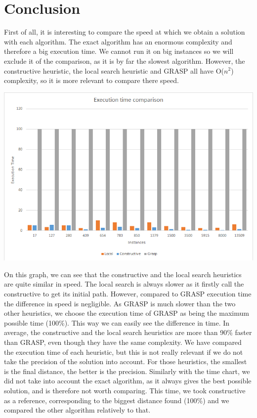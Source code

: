 \documentclass[a4paper, 12pt]{report}
\begin{document}
	\chapter{Conclusion}
	First of all, it is interesting to compare the speed at which we obtain a solution with each algorithm. The exact algorithm has an enormous complexity and therefore a big execution time. We cannot run it on big instances so we will exclude it of the comparison, as it is by far the slowest algorithm.
	However, the constructive heuristic, the local search heuristic and GRASP all have O($n^{2}$) complexity, so it is more relevant to compare there speed.
	\begin{center}
		\includegraphics[width=450pt]{TimeComparison.png}
	\end{center}
	On this graph, we can see that the constructive and the local search heuristics are quite similar in speed. The local search is always slower as it firstly call the constructive to get its initial path. However, compared to GRASP execution time the difference in speed is negligible.
	As GRASP is much slower than the two other heuristics, we choose the execution time of GRASP as being the maximum possible time (100\%). This way we can easily see the difference in time. In average, the constructive and the local search heuristics are more than 90\% faster than GRASP, even though they have the same complexity.
	\BlankLine
	We have compared the execution time of each heuristic, but this is not really relevant if we do not take the precision of the solution into account. For those heuristics, the smallest is the final distance, the better is the precision. Similarly with the time chart, we did not take into account the exact algorithm, as it always gives the best possible solution, and is therefore not worth comparing. This time, we took constructive as a reference, corresponding to the biggest distance found (100\%) and we compared the other algorithm relatively to that.
\end{document}
